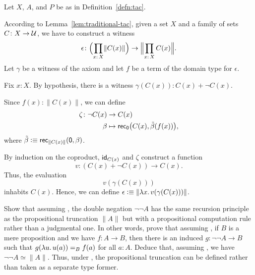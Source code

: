 \begin{solution}
    Let $X$, $A$, and $P$ be as in Definition~\ref{defn:tac}.

    According to Lemma~\ref{lem:traditional-tac}, given a set $X$ and a family of sets $C\colon X\to\univ$, we have to construct a witness
    \[
        \epsilon\colon\Bigl(\prod_{x\colon X}\lVert C(x)\rVert\Bigr)
        \to
        \Bigl\lVert\prod_{x\colon X}C(x)\Bigr\rVert.
    \]
    Let $\gamma$ be a witness of the axiom and let $f$ be a term of the domain type for $\epsilon$.
    
    Fix $x\colon X$. By hypothesis, there is a witness $\gamma(C(x))\colon C(x)+\neg C(x)$.

    Since $f(x)\colon\lVert C(x)\rVert$, we can define
    \begin{align*}
        \zeta\colon\neg C(x)&\to C(x)\\
        \beta&\mapsto\fun{rec}_{\fun0}
            \bigl(
                C(x),\tilde\beta(f(x))
            \bigr),
    \end{align*}
    where $\tilde\beta\mathrel{\vcentcolon}\equiv\mathsf{rec}_{\lVert C(x)\rVert}(\mathsf{0},\beta)$.
    
    By induction on the coproduct, $\mathsf{id}_{C(x)}$ and $\zeta$ construct a function
    \[
        v\colon(C(x)+\neg C(x))\to C(x).
    \]
    Thus, the evaluation
    \[
        v(\gamma(C(x)))
    \]
    inhabits $C(x)$. Hence, we can define $\epsilon\mathrel{\vcentcolon}\equiv\lVert \lambda x.\,v(\gamma(C(x)))\rVert$.
    
\end{solution}

\begin{exr}\label{exr:lem-implies-neg-neg-equals-truncation}
    Show that assuming\/ \Lem, the double negation\/ $\neg\neg A$ has the same recursion principle as the propositional truncation\/ $\lVert A\rVert$ but with a propositional computation rule rather than a judgmental one. In other words, prove that assuming\/ \Lem, if\/ $B$ is a mere proposition and we have\/ $f\colon A\to B$, then there is an induced\/ $g\colon\neg\neg A\to B$ such that\/ $g(\lambda u.\,u(a))\mathrel{=_{B}}f(a)$ for all\/ $a\colon A$. Deduce that, assuming\/ \Lem, we have\/ $\neg\neg A\simeq\lVert A\rVert$. Thus, under\/ \Lem, the propositional truncation can be defined rather than taken as a separate type former.
\end{exr}

